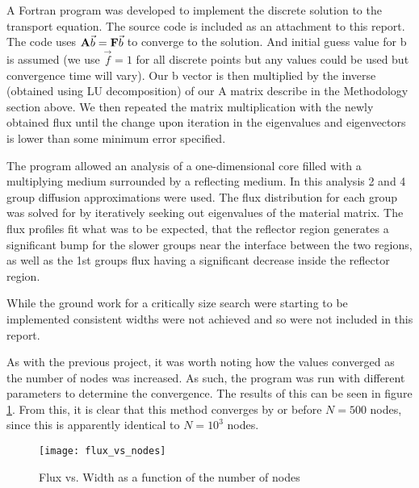\documentclass[../main.tex]{subfiles}
\begin{document}
A Fortran program was developed to implement the discrete solution to the transport equation. The source code is included as an attachment to this report. The code uses $\mathbf{A} \vec{b} = \mathbf{F} \vec{b}$ to converge to the solution. And initial guess value for b is assumed (we use $\vec{f}=1$ for all discrete points but any values could be used but convergence time will vary). Our b vector is then multiplied by the inverse (obtained using LU decomposition) of our A matrix describe in the Methodology section above. We then repeated the matrix multiplication with the newly obtained flux until the change upon iteration in the eigenvalues and eigenvectors is lower than some minimum error specified.

The program allowed an analysis of a one-dimensional core filled with a multiplying medium surrounded by a reflecting medium. In this analysis 2 and 4 group diffusion approximations were used. The flux distribution for each group was solved for by iteratively seeking out eigenvalues of the material matrix. The flux profiles fit what was to be expected, that the reflector region generates a significant bump for the slower groups near the interface between the two regions, as well as the 1st groups flux having a significant decrease inside the reflector region. 



While the ground work for a critically size search were starting to be implemented consistent widths were not achieved and so were not included in this report.

As with the previous project, it was worth noting how the values converged as the number of nodes was increased. As such, the program was run with different parameters to determine the convergence. The results of this can be seen in figure \ref{fig:flux_vs_nodes}. From this, it is clear that this method converges by or before $N=500$ nodes, since this is apparently identical to $N=10^3$ nodes.

\begin{figure}
\centering
\texttt{[image: flux\_vs\_nodes]}
\caption{Flux vs. Width as a function of the number of nodes}
\label{fig:flux_vs_nodes}
\end{figure}
\end{document}
